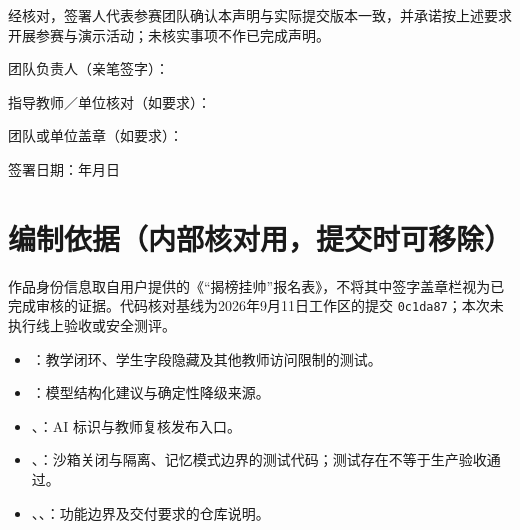 \documentclass[UTF8,a4paper,zihao=-4,fontset=fandol]{ctexart}
\begin{document}
经核对，签署人代表参赛团队确认本声明与实际提交版本一致，并承诺按上述要求开展参赛与演示活动；未核实事项不作已完成声明。

\vspace{1em}
\noindent 团队负责人（亲笔签字）：\underline{\hspace{6cm}}\par
\noindent 指导教师／单位核对（如要求）：\underline{\hspace{5cm}}\par
\noindent 团队或单位盖章（如要求）：\underline{\hspace{5.5cm}}\par
\noindent 签署日期：\underline{\hspace{1.4cm}}年\underline{\hspace{1cm}}月\underline{\hspace{1cm}}日

\appendix
\section{编制依据（内部核对用，提交时可移除）}
\small
作品身份信息取自用户提供的《“揭榜挂帅”报名表》，不将其中签字盖章栏视为已完成审核的证据。代码核对基线为2026年9月11日工作区的提交 \texttt{0c1da87}；本次未执行线上验收或安全测评。
\begin{itemize}
  \item {}：教学闭环、学生字段隐藏及其他教师访问限制的测试。
  \item {}：模型结构化建议与确定性降级来源。
  \item {}、：AI 标识与教师复核发布入口。
  \item {}、：沙箱关闭与隔离、记忆模式边界的测试代码；测试存在不等于生产验收通过。
  \item {}、、：功能边界及交付要求的仓库说明。
\end{itemize}
\end{document}
